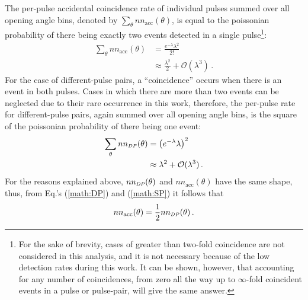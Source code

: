 The per-pulse accidental coincidence rate of individual pulses summed over all opening angle bins, denoted by $\sum_{\theta} nn_{\text{acc}}(\theta)$, is equal to the poissonian probability of there being exactly two events detected in a single pulse\footnote{For the sake of brevity, cases of greater than two-fold coincidence are not considered in this analysis, and it is not necessary because of the low detection rates during this work.
It can be shown, however, that accounting for any number of coincidences, from zero all the way up to $\infty$-fold coincident events in a pulse or pulse-pair, will give the same answer.}:
\begin{equation} \label{math:SP}
    \begin{split}
    \sum_{\theta} nn_{\text{acc}}(\theta) & = \frac{e^{-\lambda}\lambda^{2}}{2!} \\
        &\approx \frac{\lambda^2}{{2}} + \mathcal{O}(\lambda^3) \, .
    \end{split}
\end{equation}
For the case of different-pulse pairs, a ``coincidence'' occurs when there is an event in both pulses.
Cases in which there are more than two events can be neglected due to their rare occurrence in this work, therefore, the per-pulse rate for different-pulse pairs, again summed over all opening angle bins, is the square of the poissonian probability of there being one event:
\begin{equation} \label{math:DP}
    \begin{split}
   \sum_{\theta} nn_{\scaleto{DP}{4pt}}(\theta)&= \left(e^{-\lambda}\lambda\right)^{2} \\
    &\approx \lambda^2 + \mathcal{O}(\lambda^3) \, .
    \end{split}
\end{equation}
For the reasons explained above, $nn_{\scaleto{DP}{4pt}}(\theta)$ and $nn_{\text{acc}}(\theta)$ have the same shape, thus, from Eq.'s (\ref{math:DP}) and (\ref{math:SP}) it follows that 
\begin{equation}
\label{eq:uncorr_DP}
nn_{\text{acc}}(\theta) = \frac{1}{2}nn_{\scaleto{DP}{4pt}}(\theta) \,.
\end{equation}

